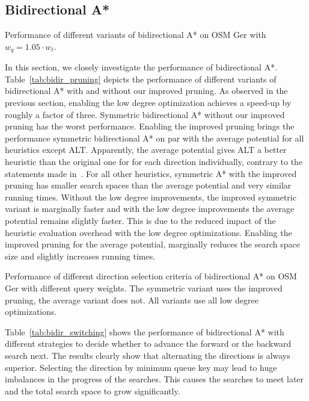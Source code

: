 \documentclass[manuscript,review]{acmart}
\begin{document}
\subsection{Bidirectional A*}

\begin{table}
\centering
\caption{Performance of different variants of bidirectional A* on OSM Ger with $w_q = 1.05 \cdot w_\ell$.}\label{tab:bidir_pruning}

\end{table}

In this section, we closely investigate the performance of bidirectional A*.
Table~\ref{tab:bidir_pruning} depicts the performance of different variants of bidirectional A* with and without our improved pruning.
As observed in the previous section, enabling the low degree optimization achieves a speed-up by roughly a factor of three.
Symmetric bidirectional A* without our improved pruning has the worst performance.
Enabling the improved pruning brings the performance symmetric bidirectional A* on par with the average potential for all heuristics except ALT.
Apparently, the average potential gives ALT a better heuristic than the original one for for each direction individually, contrary to the statements made in~\cite{gh-cspas-05}.
For all other heuristics, symmetric A* with the improved pruning has smaller search spaces than the average potential and very similar running times.
Without the low degree improvements, the improved symmetric variant is marginally faster and with the low degree improvements the average potential remains slightly faster.
This is due to the reduced impact of the heuristic evaluation overhead with the low degree optimizations.
Enabling the improved pruning for the average potential, marginally reduces the search space size and slightly increases running times.

\begin{table}
\centering
\caption{
Performance of different direction selection criteria of bidirectional A* on OSM Ger with different query weights.
The symmetric variant uses the improved pruning, the average variant does not.
All variants use all low degree optimizations.
}\label{tab:bidir_switching}

\end{table}

Table~\ref{tab:bidir_switching} shows the performance of bidirectional A* with different strategies to decide whether to advance the forward or the backward search next.
The results clearly show that alternating the directions is always superior.
Selecting the direction by minimum queue key may lead to huge imbalances in the progress of the searches.
This causes the searches to meet later and the total search space to grow significantly.
\end{document}
